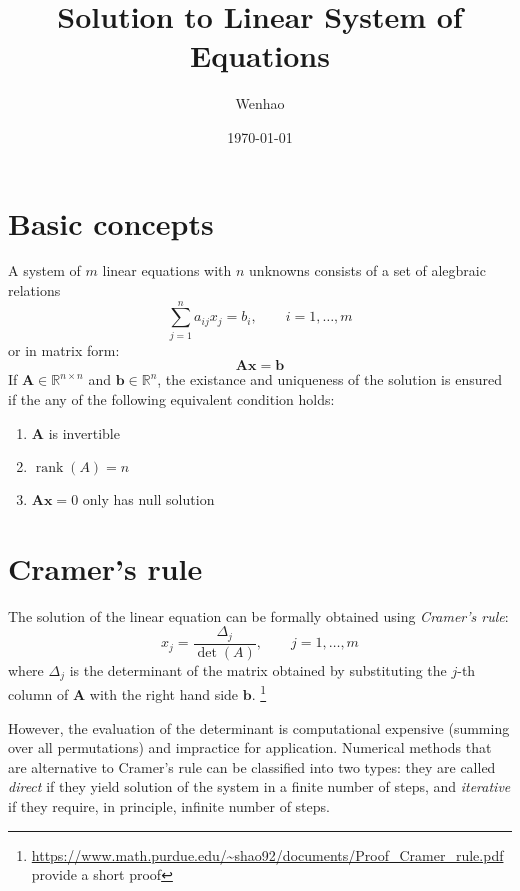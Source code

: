 \documentclass{article}
\DeclareMathOperator{\rank}{rank}
\begin{document}
\title{Solution to Linear System of Equations}
\author{Wenhao}
\date{\today}
\maketitle

\section{Basic concepts}
A system of $m$ linear equations with $n$ unknowns consists of a set of alegbraic relations
\begin{equation*}
    \sum_{j=1}^n a_{ij}x_j = b_i,\qquad i = 1, \dots, m
\end{equation*}
or in matrix form:
\begin{equation}
    \label{matrixform}
    \mathbf{A}\mathbf{x} = \mathbf{b}
\end{equation}
If $\mathbf{A}\in \mathbb{R}^{n\times n}$ and $\mathbf{b}\in \mathbb{R}^{n}$, the 
existance and uniqueness of the solution is ensured if the any of the following equivalent 
condition holds:
\begin{enumerate}
    \item $\mathbf{A}$ is invertible
    \item $\rank(A) = n$
    \item $\mathbf{A}\mathbf{x} =0$ only has null solution
\end{enumerate}

\section{Cramer's rule}
The solution of the linear equation can be formally obtained using \emph{Cramer's rule}:
\begin{equation}
    \label{cramer_rule}
    x_j = \frac{\Delta_j}{\det(A)},\qquad j = 1, \dots, m  
\end{equation}
where $\Delta_j$ is the determinant of the matrix obtained by substituting the $j$-th 
column of $\mathbf{A}$ with the right hand side $\mathbf{b}$.
\footnote{\url{https://www.math.purdue.edu/~shao92/documents/Proof_Cramer_rule.pdf} provide a short proof}

However, the evaluation of the determinant is computational expensive (summing over all 
permutations) and impractice for application. Numerical methods that are alternative to 
Cramer's rule can be classified into two types:
they are called \emph{direct} if they yield solution of the system in a finite number of 
steps, and \emph{iterative} if they require, in principle, infinite number of steps.
\end{document}
